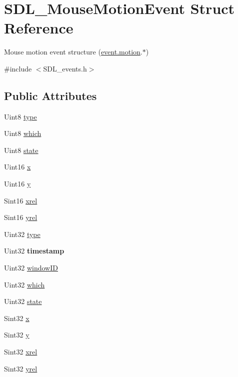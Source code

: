 \hypertarget{structSDL__MouseMotionEvent}{\section{S\+D\+L\+\_\+\+Mouse\+Motion\+Event Struct Reference}
\label{structSDL__MouseMotionEvent}
}


Mouse motion event structure (\hyperlink{unionSDL__Event_ac3c89e190faacbe84280cd539453bab6}{event.\+motion}.$\ast$)  




{\ttfamily \#include $<$S\+D\+L\+\_\+events.\+h$>$}

\subsection*{Public Attributes}
\begin{DoxyCompactItemize}
\item 
Uint8 \hyperlink{structSDL__MouseMotionEvent_a431dd28cd6db6a7335cf633dbeb80cfb}{type}
\item 
Uint8 \hyperlink{structSDL__MouseMotionEvent_a6f04c17b4305683915e2fd2dc3c36dbc}{which}
\item 
Uint8 \hyperlink{structSDL__MouseMotionEvent_a3f6e9bad9d959b824881ba09e05b7024}{state}
\item 
Uint16 \hyperlink{structSDL__MouseMotionEvent_a36398bb4a5308446a262b0bfc8baa80a}{x}
\item 
Uint16 \hyperlink{structSDL__MouseMotionEvent_a7e6a7b1f8713d1968dc913908e8ea448}{y}
\item 
Sint16 \hyperlink{structSDL__MouseMotionEvent_a1c01d9aba2a20778fb45a15dca39ef58}{xrel}
\item 
Sint16 \hyperlink{structSDL__MouseMotionEvent_a7674c8b92d039ab948f671a180fa7b30}{yrel}
\item 
Uint32 \hyperlink{structSDL__MouseMotionEvent_a431dd28cd6db6a7335cf633dbeb80cfb}{type}
\item 
\hypertarget{structSDL__MouseMotionEvent_af530bc0ef327ea6d497c5b1da119841c}{Uint32 {\bfseries timestamp}}\label{structSDL__MouseMotionEvent_af530bc0ef327ea6d497c5b1da119841c}

\item 
Uint32 \hyperlink{structSDL__MouseMotionEvent_aa9976725242ada93a9e18e7fdf5796e6}{window\+I\+D}
\item 
Uint32 \hyperlink{structSDL__MouseMotionEvent_a6f04c17b4305683915e2fd2dc3c36dbc}{which}
\item 
Uint32 \hyperlink{structSDL__MouseMotionEvent_a3f6e9bad9d959b824881ba09e05b7024}{state}
\item 
Sint32 \hyperlink{structSDL__MouseMotionEvent_a36398bb4a5308446a262b0bfc8baa80a}{x}
\item 
Sint32 \hyperlink{structSDL__MouseMotionEvent_a7e6a7b1f8713d1968dc913908e8ea448}{y}
\item 
Sint32 \hyperlink{structSDL__MouseMotionEvent_a1c01d9aba2a20778fb45a15dca39ef58}{xrel}
\item 
Sint32 \hyperlink{structSDL__MouseMotionEvent_a7674c8b92d039ab948f671a180fa7b30}{yrel}
\end{DoxyCompactItemize}


